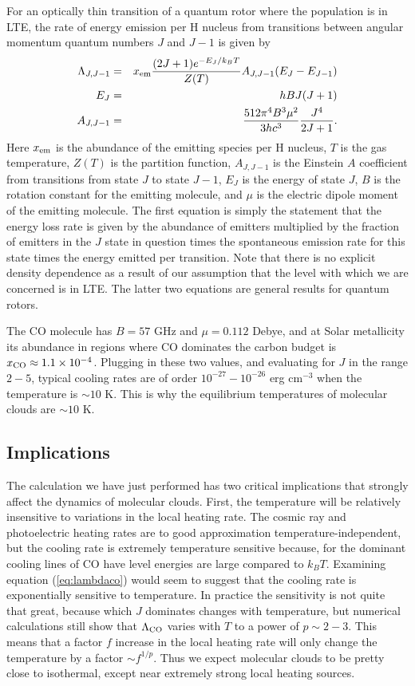 For an optically thin transition of a quantum rotor where the population is in LTE, the rate of energy emission per H nucleus from transitions between angular momentum quantum numbers $J$ and $J-1$ is given by
\begin{eqnarray}
\label{eq:lambdaco}
\Lambda_{J,J-1} & = & x_{\rm em} \frac{(2J+1)e^{-E_J/k_B T}}{Z(T)} A_{J,J-1} (E_J - E_{J-1}) \\
E_J & = & h B J (J+1) \\
A_{J,J-1} & = & \frac{512\pi^4 B^3\mu^2}{3hc^3} \frac{J^4}{2J+1}.
\end{eqnarray}
Here $x_{\rm em}$ is the abundance of the emitting species per H nucleus, $T$ is the gas temperature, $Z(T)$ is the partition function, $A_{J,J-1}$ is the Einstein $A$ coefficient from transitions from state $J$ to state $J-1$, $E_J$ is the energy of state $J$, $B$ is the rotation constant for the emitting molecule, and $\mu$ is the electric dipole moment of the emitting molecule. The first equation is simply the statement that the energy loss rate is given by the abundance of emitters multiplied by the fraction of emitters in the $J$ state in question times the spontaneous emission rate for this state times the energy emitted per transition. Note that there is no explicit density dependence as a result of our assumption that the level with which we are concerned is in LTE. The latter two equations are general results for quantum rotors.

The CO molecule has $B=57$ GHz and $\mu=0.112$ Debye, and at Solar metallicity its abundance in regions where CO dominates the carbon budget is $x_{\rm CO} \approx 1.1\times 10^{-4}$. Plugging in these two values, and evaluating for $J$ in the range $2-5$, typical cooling rates are of order $10^{-27}-10^{-26}$ erg cm$^{-3}$ when the temperature is $\sim 10$ K. This is why the equilibrium temperatures of molecular clouds are $\sim 10$ K.

\subsection{Implications}

The calculation we have just performed has two critical implications that strongly affect the dynamics of molecular clouds. First, the temperature will be relatively insensitive to variations in the local heating rate. The cosmic ray and photoelectric heating rates are to good approximation temperature-independent, but the cooling rate is extremely temperature sensitive because, for the dominant cooling lines of CO have level energies are large compared to $k_B T$. Examining equation (\ref{eq:lambdaco}) would seem to suggest that the cooling rate is exponentially sensitive to temperature. In practice the sensitivity is not quite that great, because which $J$ dominates changes with temperature, but numerical calculations still show that $\Lambda_{\rm CO}$ varies with $T$ to a power of $p \sim 2-3$. This means that a factor $f$ increase in the local heating rate will only change the temperature by a factor $\sim f^{1/p}$. Thus we expect molecular clouds to be pretty close to isothermal, except near extremely strong local heating sources.

